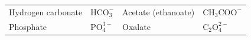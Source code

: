 {{\begin{center}
\begin{xtabular}[t]{|l|l|l|l|}
    
        Hydrogen carbonate &
    
    
        \begin{math}\mathrm{HCO}_{3}^{-}\end{math} &
    
    
        Acetate (ethanoate) &
    
    
        \begin{math}{\mathrm{CH}}_{3}{\mathrm{COO}}^{-}\end{math}%
     \tabularnewline{}
    
    
        Phosphate &
    
    
        \begin{math}\mathrm{PO}_{4}^{3-}\end{math} &
    
    
        Oxalate &
    
    
        \begin{math}{\mathrm{C}}_{2}\mathrm{O}_{4}^{2-}\end{math}%
     \tabularnewline{}
    

\end{xtabular}
\end{center}}}
